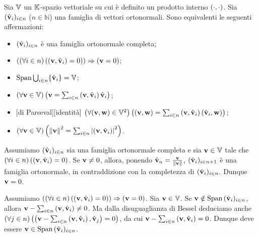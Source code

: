 \begin{Theorem}
	Sia $\mathbb{V}$ un $\mathbb{K}$-spazio vettoriale su cui \`e definito un
  prodotto interno $\left ( \cdot , \cdot \right )$. Sia
  $(\hat{\mathbf{v}}_i)_{i \in n}$ ($n \in \mathbb{N}$) una famiglia di vettori
  ortonormali. Sono equivalenti le seguenti affermazioni:
	\begin{itemize}
		\item $(\hat{\mathbf{v}}_i)_{i \in n}$ \`e una famiglia ortonormale completa;
		\item $\left ( \left ( \forall i \in n \right ) \left ( \left ( \mathbf{v} , \hat{\mathbf{v}}_i \right ) = 0 \right ) \right ) \Rightarrow \left ( \mathbf{v} = 0 \right )$;
		\item $\operatorname{\operatorname{Span}}{\bigcup_{i \in n} \lbrace \hat{\mathbf{v}}_i \rbrace} = \mathbb{V}$;
		\item $\left ( \forall \mathbf{v} \in \mathbb{V} \right ) \left ( \mathbf{v} = \sum_{i \in n} \left ( \mathbf{v} , \hat{\mathbf{v}}_i \right )\hat{\mathbf{v}}_i \right )$;
		\item {}[di Parseval][identit\`a] $\left ( \forall (\mathbf{v},\mathbf{w}) \in \mathbb{V}^2 \right ) \left ( \left ( \mathbf{v} , \mathbf{w} \right ) = \sum_{i \in n} \left ( \mathbf{v} , \hat{\mathbf{v}}_i \right )\left ( \hat{\mathbf{v}}_i , \mathbf{w} \right ) \right )$;
		\item $\ForAll{\Vector \in \LinearSpace}{\Norm{\Vector}^2 = \sum_{i \in n}\AbsoluteValue{\InnerProduct{\Vector}{\OrthonormalBase_i}}^2}$.
	\end{itemize}
\end{Theorem}
\Proof Assumiamo $(\hat{\mathbf{v}}_i)_{i \in n}$ sia una famiglia ortonormale completa e sia $\mathbf{v} \in \mathbb{V}$ tale che $\left ( \forall i \in n \right ) \left ( \left ( \mathbf{v} , \hat{\mathbf{v}}_i \right ) = 0 \right )$. Se $\mathbf{v} \neq 0$, allora, ponendo $\OrthonormalBase_n = \frac{\Vector}{\Norm{\Vector}}$, $(\hat{\mathbf{v}}_i)_{i \in n + 1}$ \`e una famiglia ortonormale, in contraddizione con la completezza di $(\hat{\mathbf{v}}_i)_{i \in n}$. Dunque $\mathbf{v} = 0$.
\par Assumiamo $\left ( \left ( \forall i \in n \right ) \left ( \left ( \mathbf{v} , \hat{\mathbf{v}}_i \right ) = 0 \right ) \right ) \Rightarrow \left ( \mathbf{v} = 0 \right )$. Sia $\mathbf{v} \in \mathbb{V}$. Se $\mathbf{v} \notin \operatorname{\operatorname{Span}}{(\hat{\mathbf{v}}_i)_{i \in n}}$, allora $\mathbf{v} - \sum_{i \in n} \left ( \mathbf{v} , \hat{\mathbf{v}}_i \right ) \neq 0$. Ma dalla disuguaglianza di Bessel deduciamo anche $\left ( \forall j \in n \right ) \left ( \left ( \mathbf{v} - \sum_{i \in n} \left ( \mathbf{v} , \hat{\mathbf{v}}_i \right ) , \hat{\mathbf{v}}_j \right ) = 0 \right )$, da cui $\mathbf{v} - \sum_{i \in n} \left ( \mathbf{v} , \hat{\mathbf{v}}_i \right ) = 0$. Dunque deve essere $\mathbf{v} \in \operatorname{\operatorname{Span}}{(\hat{\mathbf{v}}_i)_{i \in n}}$.

